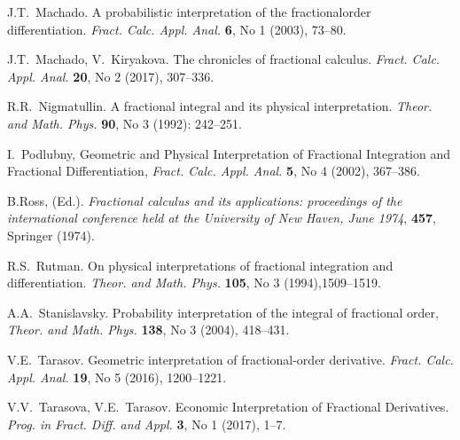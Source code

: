 \documentclass[twoside,reqno,11pt]{fcaa-var} %
\begin{document}
\begin{thebibliography}{99}
 J.T.~Machado. A probabilistic interpretation of the fractionalorder differentiation. \textit{Fract. Calc. Appl. Anal.} \textbf{6}, No 1 (2003), 73--80.


 J.T.~Machado, V.~Kiryakova. The chronicles of fractional calculus. \textit{Fract. Calc. Appl. Anal.} \textbf{20}, No 2 (2017), 307--336.


 R.R.~Nigmatullin. A fractional integral and its physical interpretation. \textit{Theor. and Math. Phys.} \textbf{90}, No 3 (1992): 242--251.

 I.~Podlubny, Geometric and Physical Interpretation of Fractional Integration and Fractional Differentiation, \textit{Fract. Calc. Appl. Anal.} \textbf{5}, No 4 (2002), 367--386.



 B.Ross, (Ed.). \textit{Fractional calculus and its applications: proceedings of the international conference held at the University of New Haven, June 1974}, \textbf{457}, Springer (1974).
 
 R.S.~Rutman. On physical interpretations of fractional integration and differentiation. \textit{Theor. and Math. Phys.} \textbf{105}, No 3 (1994),1509--1519.

 A.A.~Stanislavsky.  Probability interpretation of the integral of fractional order, \textit{Theor. and Math. Phys.} \textbf{138}, No 3 (2004), 418--431.

 V.E.~Tarasov. Geometric interpretation of fractional-order derivative. \textit{Fract. Calc. Appl. Anal.} \textbf{19}, No 5 (2016), 1200--1221.

 V.V.~Tarasova, V.E.~Tarasov. Economic Interpretation of Fractional Derivatives. \textit{Prog. in Fract. Diff. and Appl.} \textbf{3}, No 1 (2017), 1--7.  


\end{thebibliography}
\end{document}
